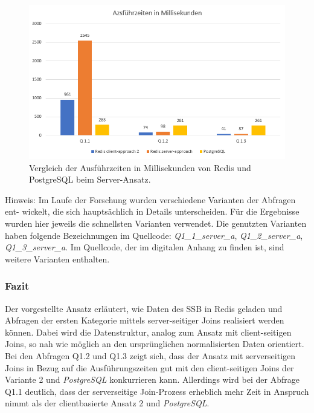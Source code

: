 \begin{figure}[ht]  %
    \centering      %
    \includegraphics[width=1\textwidth]{pictures/results/results-server.png}
    \caption{Vergleich der Ausführzeiten in Millisekunden von Redis und PostgreSQL beim Server-Ansatz.}      %
    \label{pic:results-server}    %
\end{figure}

Hinweis: Im Laufe der Forschung wurden verschiedene Varianten der Abfragen ent-
wickelt, die sich hauptsächlich in Details unterscheiden. Für die Ergebnisse wurden
hier jeweils die schnellsten Varianten verwendet. Die
genutzten Varianten haben folgende Bezeichnungen im Quellcode: \emph{Q1\_1\_server\_a}, \emph{Q1\_2\_server\_a}, \emph{Q1\_3\_server\_a}. Im Quellcode,
der im digitalen Anhang zu finden ist, sind weitere Varianten enthalten.


\subsubsection{Fazit}
Der vorgestellte Ansatz erläutert, wie Daten des \ac{SSB} in Redis geladen und Abfragen der ersten Kategorie mittels server-seitiger Joins realisiert werden können. Dabei wird die Datenstruktur, analog zum Ansatz mit client-seitigen Joins, so nah wie möglich an den ursprünglichen normalisierten Daten orientiert. Bei den Abfragen Q1.2 und Q1.3 zeigt sich, dass der Ansatz mit serverseitigen Joins in Bezug auf die Ausführungszeiten gut mit den client-seitigen Joins der Variante 2 und \emph{PostgreSQL} konkurrieren kann. Allerdings wird bei der Abfrage Q1.1 deutlich, dass der serverseitige Join-Prozess erheblich mehr Zeit in Anspruch nimmt als der clientbasierte Ansatz 2 und \emph{PostgreSQL}.

